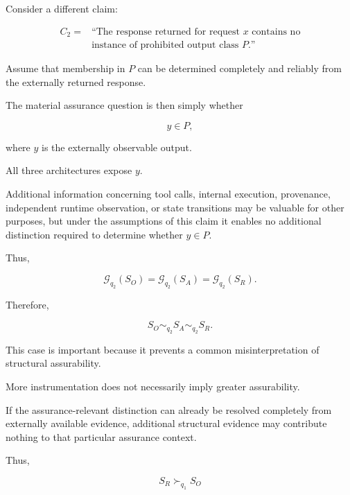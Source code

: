 Consider a different claim:

\begin{equation}
  \begin{aligned}
    C_2 ={} & \text{``The response returned for request }x\text{ contains no} \\
            & \text{instance of prohibited output class }P\text{.''}
  \end{aligned}
  \label{eq:claim-output}
\end{equation}

Assume that membership in \(P\) can be determined completely and
reliably from the externally returned response.

The material assurance question is then simply whether

\begin{equation}
  y \in P,
\end{equation}

where \(y\) is the externally observable output.

All three architectures expose \(y\).

Additional information concerning tool calls, internal execution,
provenance, independent runtime observation, or state transitions may
be valuable for other purposes, but under the assumptions of this claim
it enables no additional distinction required to determine whether
\(y\in P\).

Thus,

\begin{equation}
  \mathcal{G}_{q_2}(S_O)
  =
  \mathcal{G}_{q_2}(S_A)
  =
  \mathcal{G}_{q_2}(S_R).
\end{equation}

Therefore,

\begin{equation}
  S_O
  \sim_{q_2}
  S_A
  \sim_{q_2}
  S_R.
  \label{eq:case2-equivalence}
\end{equation}

This case is important because it prevents a common misinterpretation
of structural assurability.

More instrumentation does not necessarily imply greater assurability.

If the assurance-relevant distinction can already be resolved completely
from externally available evidence, additional structural evidence may
contribute nothing to that particular assurance context.

Thus,

\begin{equation}
  S_R\succ_{q_1}S_O
\end{equation}

